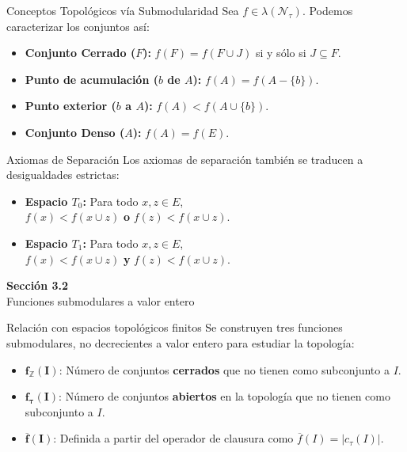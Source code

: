\documentclass{beamer}
\begin{document}
  \begin{frame}{Conceptos Topológicos vía Submodularidad}
    Sea $f \in \lambda(\mathcal{N}_{\tau})$. Podemos caracterizar los conjuntos así:
    
    \vspace{0.5cm}
    \begin{itemize}[<+->]
      \item \textbf{Conjunto Cerrado ($F$):} $f(F)=f(F\cup J)$ si y sólo si $J\subseteq F$.
      \item \textbf{Punto de acumulación ($b$ de $A$):} $f(A)=f(A-\{b\})$.
      \item \textbf{Punto exterior ($b$ a $A$):} $f(A)<f(A\cup \{b\})$.
      \item \textbf{Conjunto Denso ($A$):} $f(A)=f(E)$.
    \end{itemize}
  \end{frame}

  \begin{frame}{Axiomas de Separación}
    Los axiomas de separación también se traducen a desigualdades estrictas:
    
    \vspace{0.5cm}
    \begin{itemize}[<+->]
      \item \textbf{Espacio $T_0$:} Para todo $x, z \in E$, \\ 
            $f(x)<f(x\cup z)$ \textbf{o} $f(z)<f(x\cup z)$.
      \item \textbf{Espacio $T_1$:} Para todo $x, z \in E$, \\ 
            $f(x)<f(x\cup z)$ \textbf{y} $f(z)<f(x\cup z)$.
    \end{itemize}
  \end{frame}

  \begin{frame}
    \begin{center}
      \Huge \textbf{Sección 3.2}\\
      \vspace{0.5cm}
      \Large Funciones submodulares a valor entero
    \end{center}
  \end{frame}

  \begin{frame}{Relación con espacios topológicos finitos}
    Se construyen tres funciones submodulares, no decrecientes a valor entero para estudiar la topología:
    
    \vspace{0.5cm}
    \begin{itemize}[<+->]
      \item $\mathbf{f_{\mathbb{Z}}(I)}$: Número de conjuntos \textbf{cerrados} que no tienen como subconjunto a $I$.
      \item $\mathbf{f_{\tau}(I)}$: Número de conjuntos \textbf{abiertos} en la topología que no tienen como subconjunto a $I$.
      \item $\mathbf{\overline{f}(I)}$: Definida a partir del operador de clausura como $\overline{f}(I)=|c_{\tau}(I)|$.
    \end{itemize}
  \end{frame}
\end{document}
